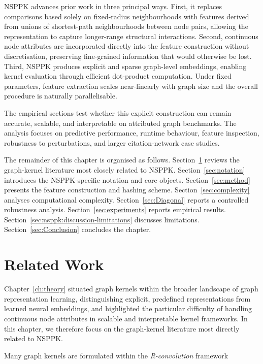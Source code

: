NSPPK advances prior work in three principal ways. First, it replaces
comparisons based solely on fixed-radius neighbourhoods with features derived
from unions of shortest-path neighbourhoods between node pairs, allowing the
representation to capture longer-range structural interactions. Second,
continuous node attributes are incorporated directly into the feature
construction without discretisation, preserving fine-grained information that
would otherwise be lost. Third, NSPPK produces explicit and sparse graph-level
embeddings, enabling kernel evaluation through efficient dot-product
computation. Under fixed parameters, feature extraction scales near-linearly
with graph size and the overall procedure is naturally parallelisable.

The empirical sections test whether this explicit construction can remain
accurate, scalable, and interpretable on attributed graph benchmarks. The
analysis focuses on predictive performance, runtime behaviour, feature
inspection, robustness to perturbations, and larger citation-network case
studies.

The remainder of this chapter is organised as follows.
Section~\ref{sec:relatedwork} reviews the graph-kernel literature most closely
related to NSPPK.
Section~\ref{sec:notation} introduces the NSPPK-specific notation and core
objects.
Section~\ref{sec:method} presents the feature construction and hashing scheme.
Section~\ref{sec:complexity} analyses computational complexity.
Section~\ref{sec:Diagonal} reports a controlled robustness analysis.
Section~\ref{sec:experiments} reports empirical results.
Section~\ref{sec:nsppk:discussion-limitations} discusses limitations.
Section~\ref{sec:Conclusion} concludes the chapter.

\section{Related Work}
\label{sec:relatedwork}

Chapter~\ref{ch:theory} situated graph kernels within the broader landscape of
graph representation learning, distinguishing explicit, predefined
representations from learned neural embeddings, and highlighted the particular
difficulty of handling continuous node attributes in scalable and interpretable
kernel frameworks. In this chapter, we therefore focus on the graph-kernel
literature most directly related to NSPPK.

Many graph kernels are formulated within the \emph{R-convolution} framework

